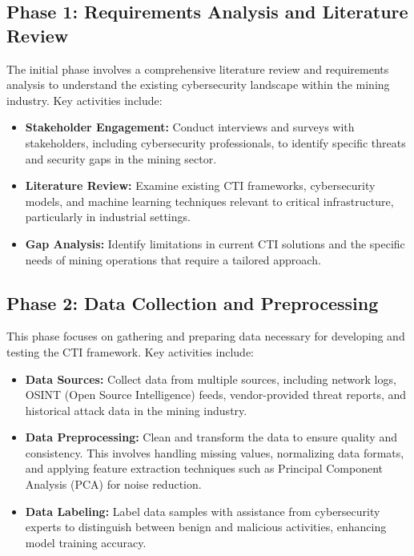 \documentclass[a4paper,twoside,12pt]{report}
\begin{document}
\subsection{Phase 1: Requirements Analysis and Literature Review}  
The initial phase involves a comprehensive literature review and requirements analysis to understand the existing cybersecurity landscape within the mining industry. Key activities include:
\begin{itemize}
    \item \textbf{Stakeholder Engagement:} Conduct interviews and surveys with stakeholders, including cybersecurity professionals, to identify specific threats and security gaps in the mining sector.
    \item \textbf{Literature Review:} Examine existing CTI frameworks, cybersecurity models, and machine learning techniques relevant to critical infrastructure, particularly in industrial settings.
    \item \textbf{Gap Analysis:} Identify limitations in current CTI solutions and the specific needs of mining operations that require a tailored approach.
\end{itemize}

\subsection{Phase 2: Data Collection and Preprocessing}  
This phase focuses on gathering and preparing data necessary for developing and testing the CTI framework. Key activities include:
\begin{itemize}
    \item \textbf{Data Sources:} Collect data from multiple sources, including network logs, OSINT (Open Source Intelligence) feeds, vendor-provided threat reports, and historical attack data in the mining industry.
    \item \textbf{Data Preprocessing:} Clean and transform the data to ensure quality and consistency. This involves handling missing values, normalizing data formats, and applying feature extraction techniques such as Principal Component Analysis (PCA) for noise reduction.
    \item \textbf{Data Labeling:} Label data samples with assistance from cybersecurity experts to distinguish between benign and malicious activities, enhancing model training accuracy.
\end{itemize}
\end{document}

